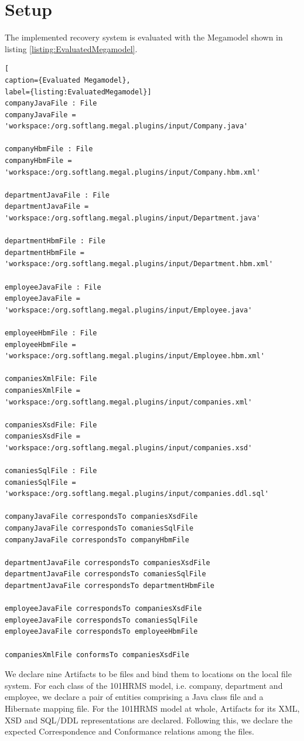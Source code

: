 \section{Setup}
\label{section:Setup}
The implemented recovery system is evaluated with the \gls{Megamodel} shown in listing \ref{listing:EvaluatedMegamodel}.
\begin{lstlisting}[
caption={Evaluated Megamodel},
label={listing:EvaluatedMegamodel}]
companyJavaFile : File
companyJavaFile = 'workspace:/org.softlang.megal.plugins/input/Company.java'

companyHbmFile : File
companyHbmFile = 'workspace:/org.softlang.megal.plugins/input/Company.hbm.xml'

departmentJavaFile : File
departmentJavaFile = 'workspace:/org.softlang.megal.plugins/input/Department.java'

departmentHbmFile : File
departmentHbmFile = 'workspace:/org.softlang.megal.plugins/input/Department.hbm.xml'

employeeJavaFile : File
employeeJavaFile = 'workspace:/org.softlang.megal.plugins/input/Employee.java'

employeeHbmFile : File
employeeHbmFile = 'workspace:/org.softlang.megal.plugins/input/Employee.hbm.xml'

companiesXmlFile: File
companiesXmlFile = 'workspace:/org.softlang.megal.plugins/input/companies.xml'

companiesXsdFile: File
companiesXsdFile = 'workspace:/org.softlang.megal.plugins/input/companies.xsd'

comaniesSqlFile : File
comaniesSqlFile = 'workspace:/org.softlang.megal.plugins/input/companies.ddl.sql'

companyJavaFile correspondsTo companiesXsdFile
companyJavaFile correspondsTo comaniesSqlFile
companyJavaFile correspondsTo companyHbmFile

departmentJavaFile correspondsTo companiesXsdFile
departmentJavaFile correspondsTo comaniesSqlFile
departmentJavaFile correspondsTo departmentHbmFile

employeeJavaFile correspondsTo companiesXsdFile
employeeJavaFile correspondsTo comaniesSqlFile
employeeJavaFile correspondsTo employeeHbmFile

companiesXmlFile conformsTo companiesXsdFile
\end{lstlisting}
We declare nine \glspl{Artifact} to be files and bind them to locations on the local file system.
For each class of the \gls{101HRMS} model, i.e. company, department and employee, we declare a pair of entities comprising a \gls{Java} class file and a \gls{Hibernate} mapping file.
For the \gls{101HRMS} model at whole, \glspl{Artifact} for its \gls{XML}, \gls{XSD} and \gls{SQL/DDL} representations are declared.
Following this, we declare the expected \gls{Correspondence} and \gls{Conformance} relations among the files.


